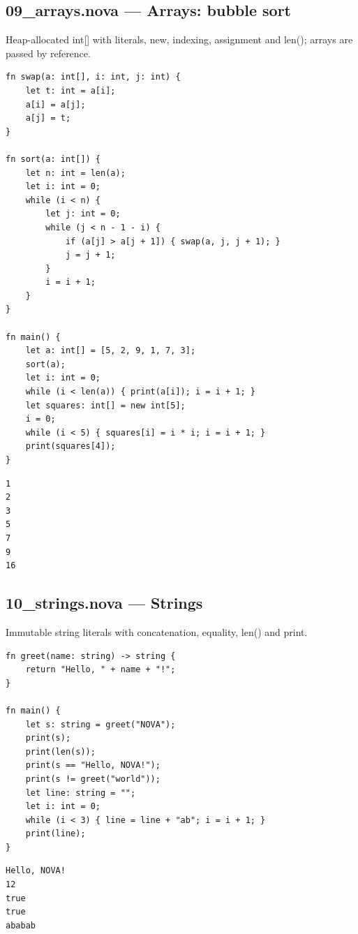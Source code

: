 \subsection*{09\_arrays.nova --- Arrays: bubble sort}
\noindent Heap-allocated int[] with literals, new, indexing, assignment and len(); arrays are passed by reference.
\begin{lstlisting}[language=nova,]
fn swap(a: int[], i: int, j: int) {
    let t: int = a[i];
    a[i] = a[j];
    a[j] = t;
}

fn sort(a: int[]) {
    let n: int = len(a);
    let i: int = 0;
    while (i < n) {
        let j: int = 0;
        while (j < n - 1 - i) {
            if (a[j] > a[j + 1]) { swap(a, j, j + 1); }
            j = j + 1;
        }
        i = i + 1;
    }
}

fn main() {
    let a: int[] = [5, 2, 9, 1, 7, 3];
    sort(a);
    let i: int = 0;
    while (i < len(a)) { print(a[i]); i = i + 1; }
    let squares: int[] = new int[5];
    i = 0;
    while (i < 5) { squares[i] = i * i; i = i + 1; }
    print(squares[4]);
}
\end{lstlisting}
\begin{tcolorbox}[colback=green!4,colframe=green!45!black,title={Program output (optimized VM)},fonttitle=\bfseries\small,boxsep=2pt,left=4pt,right=4pt,top=2pt,bottom=2pt]
\begin{lstlisting}[basicstyle=\ttfamily\scriptsize,frame=none,backgroundcolor=\color{white}]
1
2
3
5
7
9
16
\end{lstlisting}
\end{tcolorbox}
\subsection*{10\_strings.nova --- Strings}
\noindent Immutable string literals with concatenation, equality, len() and print.
\begin{lstlisting}[language=nova,]
fn greet(name: string) -> string {
    return "Hello, " + name + "!";
}

fn main() {
    let s: string = greet("NOVA");
    print(s);
    print(len(s));
    print(s == "Hello, NOVA!");
    print(s != greet("world"));
    let line: string = "";
    let i: int = 0;
    while (i < 3) { line = line + "ab"; i = i + 1; }
    print(line);
}
\end{lstlisting}
\begin{tcolorbox}[colback=green!4,colframe=green!45!black,title={Program output (optimized VM)},fonttitle=\bfseries\small,boxsep=2pt,left=4pt,right=4pt,top=2pt,bottom=2pt]
\begin{lstlisting}[basicstyle=\ttfamily\scriptsize,frame=none,backgroundcolor=\color{white}]
Hello, NOVA!
12
true
true
ababab
\end{lstlisting}
\end{tcolorbox}
